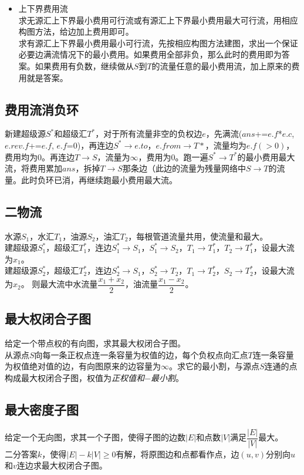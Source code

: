\begin{itemize}[wide=0pt]
\begin{itemize}[nosep,wide=0pt]
            \end{itemize}
        \item 上下界费用流
            \\求无源汇上下界最小费用可行流或有源汇上下界最小费用最大可行流，用相应构图方法，给边加上费用即可。
            \\求有源汇上下界最小费用最小可行流，先按相应构图方法建图，求出一个保证必要边满流情况下的最小费用。如果费用全部非负，那么此时的费用即为答案。如果费用有负数，继续做从$ S $到$ T $的流量任意的最小费用流，加上原来的费用就是答案。
    \end{itemize}

\subsection*{费用流消负环}
    新建超级源$ S^\ast $和超级汇$ T^\ast $，对于所有流量非空的负权边$ e $，先满流($ ans $+=$ e.f $*$ e.c $, $  e.rev.f $+=$ e.f $, $ e.f $=$ 0 $)，再连边$ S^\ast \to e.to $，$ e.from \to T\ast $，流量均为$ e.f (> 0) $，费用均为$ 0 $。再连边$ T \to S $，流量为$ \infty $，费用为$ 0 $。跑一遍$ S^\ast \to T^\ast $的最小费用最大流，将费用累加$ ans $，拆掉$ T \to S $那条边（此边的流量为残量网络中$ S \to T $的流量。此时负环已消，再继续跑最小费用最大流。

\subsection*{二物流}
    水源$ S_1 $，水汇$ T_1 $，油源$ S_2 $，油汇$ T_2 $，每根管道流量共用，使流量和最大。
    \\建超级源$ S_1^\ast $，超级汇$ T_1^\ast $，连边$ S_1^\ast \to S_1 $，$ S_1^\ast \to S_2 $，$ T_1 \to T_1^\ast $，$ T_2 \to T_1^\ast $，设最大流为$ x_1 $。
    \\建超级源$ S_2^\ast $，超级汇$ T_2^\ast $，连边$ S_2^\ast \to S_1 $，$ S_2^\ast \to T_2 $，$ T_1 \to T_2^\ast $，$ S_2 \to T_2^\ast $，设最大流为$ x_2 $。
    则最大流中水流量$ \dfrac{x_1 + x_2}{2} $，油流量$ \dfrac{x_1 - x_2}{2} $。

\subsection*{最大权闭合子图}
    给定一个带点权的有向图，求其最大权闭合子图。
    \\从源点$ S $向每一条正权点连一条容量为权值的边，每个负权点向汇点$ T $连一条容量为权值绝对值的边，有向图原来的边容量为$ \infty $。求它的最小割，与源点$ S $连通的点构成最大权闭合子图，权值为\textit{正权值和}$ - $\textit{最小割}。

\subsection*{最大密度子图}
    给定一个无向图，求其一个子图，使得子图的边数$ \left| E \right| $和点数$ \left| V \right| $满足$ \dfrac{\left| E \right|}{\left| V \right|} $最大。
    \\二分答案$ k $，使得$ \left| E \right| - k \left| V \right| \geq 0 $有解，将原图边和点都看作点，边$ (u, v) $分别向$ u $和$ v $连边求最大权闭合子图。
